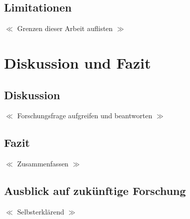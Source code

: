\documentclass{scrartcl}
\begin{document}
\subsection{Limitationen}

$\ll$ Grenzen dieser Arbeit auflisten $\gg$

\section{Diskussion und Fazit}

\subsection{Diskussion}

$\ll$ Forschungsfrage aufgreifen und beantworten $\gg$

\subsection{Fazit}

$\ll$ Zusammenfassen $\gg$

\subsection{Ausblick auf zukünftige Forschung}

$\ll$ Selbsterklärend $\gg$

\printbibliography
\listoffigures
\listoftables
\end{document}
